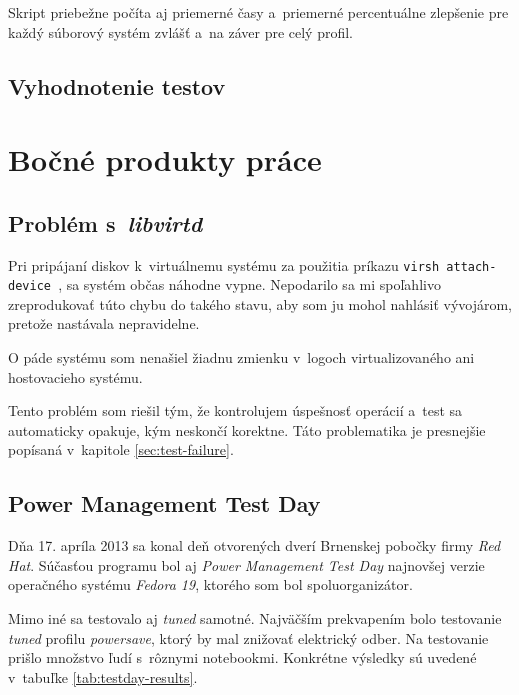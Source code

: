 Skript priebežne počíta aj priemerné časy a~priemerné percentuálne zlepšenie
pre každý súborový systém zvlášť a~na záver pre celý profil. 

%
%

\section{Vyhodnotenie testov}


%
%

\chapter{Bočné produkty práce}

%
%

\section{Problém s~\emph{libvirtd}}
\label{sec:libvirt-problem}

Pri pripájaní diskov k~virtuálnemu systému za použitia príkazu \texttt{virsh
attach-device }, sa systém občas náhodne vypne. Nepodarilo sa mi spoľahlivo
zreprodukovať túto chybu do takého stavu, aby som ju mohol nahlásiť vývojárom,
pretože nastávala nepravidelne. 

O páde systému som nenašiel žiadnu zmienku v~logoch virtualizovaného ani
hostovacieho systému. 

Tento problém som riešil tým, že kontrolujem úspešnosť operácií a~test sa
automaticky opakuje, kým neskončí korektne. Táto problematika je presnejšie
popísaná v~kapitole \ref{sec:test-failure}.

%
%

\section{Power Management Test Day}

Dňa 17. apríla 2013 sa konal deň otvorených dverí Brnenskej pobočky firmy
\emph{Red Hat}. Súčasťou programu bol aj \emph{Power Management Test Day}
najnovšej verzie operačného systému \emph{Fedora 19}, ktorého som bol
spoluorganizátor. 

Mimo iné sa testovalo aj \emph{tuned} samotné. Najväčším prekvapením bolo
testovanie \emph{tuned} profilu \emph{powersave}, ktorý by mal znižovať
elektrický odber. Na testovanie prišlo množstvo ľudí s~rôznymi notebookmi.
Konkrétne výsledky sú uvedené v~tabuľke \ref{tab:testday-results}.

